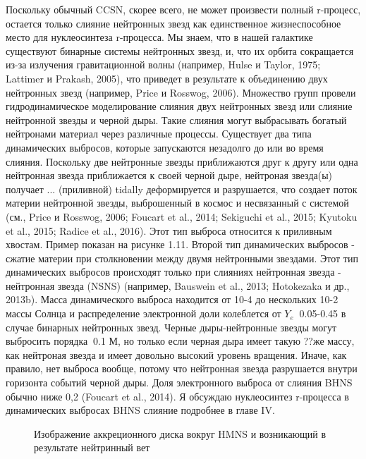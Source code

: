 \documentclass[%
bachelor,    %
natbib,      %
subf,        %
href,        %
colorlinks,  %
]{disser}
\begin{document}
Поскольку обычный CCSN, скорее всего, не может произвести полный r-процесс, остается только слияние нейтронных звезд как единственное жизнеспособное место для нуклеосинтеза r-процесса. Мы знаем, что в нашей галактике существуют бинарные системы нейтронных звезд, и, что их орбита сокращается из-за излучения гравитационной волны (например, Hulse и Taylor, 1975; Lattimer и Prakash, 2005), что приведет в результате к объединению двух нейтронных звезд (например, Price и Rosswog, 2006). Множество групп провели гидродинамическое моделирование слияния двух нейтронных звезд или слияние нейтронной звезды и черной дыры. Такие слияния могут выбрасывать богатый нейтронами материал через различные процессы. Существует два типа динамических выбросов, которые запускаются незадолго до или во время слияния. Поскольку две нейтронные звезды приближаются друг к другу или одна нейтронная звезда приближается к своей черной дыре, нейтроная звезда(ы) получает ... (приливной) tidally деформируется и разрушается, что создает поток материи нейтронной звезды, выброшенный в космос и несвязанный с системой (см., Price и Rosswog, 2006; Foucart et al., 2014; Sekiguchi et al., 2015; Kyutoku et al., 2015; Radice et al., 2016). Этот тип выброса относится к приливным хвостам. Пример показан на рисунке 1.11. Второй тип динамических выбросов - сжатие материи при столкновении между двумя нейтронными звездами. Этот тип динамических выбросов происходят только при слияниях нейтронная звезда - нейтронная звезда (NSNS) (например, Bauswein et al., 2013; Hotokezaka и др., 2013b). Масса динамического выброса находится от 10-4 до нескольких 10-2 массы Солнца и распределение электронной доли колеблется от $Y_e ~$ 0.05-0.45 в случае бинарных нейтронных звезд. Черные дыры-нейтронные звезды могут выбросить порядка $~$0.1 М, но только если черная дыра имеет такую ??же массу, как нейтроная звезда и имеет довольно высокий уровень вращения. Иначе, как правило, нет выброса вообще, потому что нейтронная звезда разрушается внутри горизонта событий черной дыры. Доля электронного выброса от слияния BHNS обычно ниже 0,2 (Foucart et al., 2014). Я обсуждаю нуклеосинтез r-процесса в динамических выбросах BHNS слияние подробнее в главе IV.

\begin{figure}[h]
	\caption{Изображение аккреционного диска вокруг HMNS и возникающий в результате нейтринный вет}
	\label{ris:12}
\end{figure}
\end{document}
